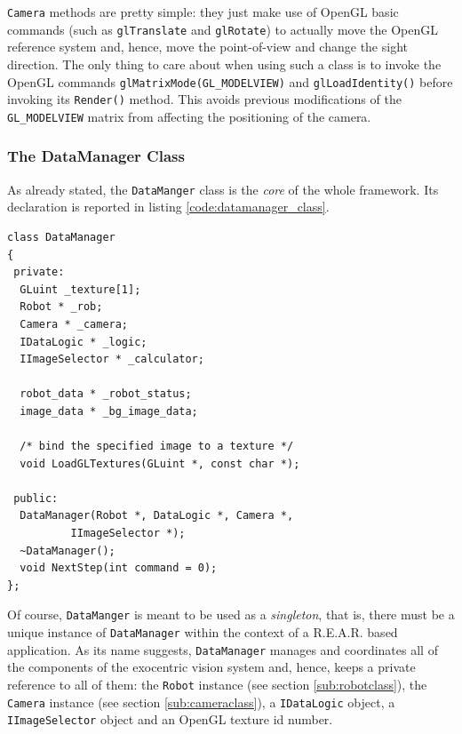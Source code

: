 %
\texttt{Camera} methods are pretty simple: they just make 
use of OpenGL basic commands (such as \texttt{glTranslate} 
and \texttt{glRotate}) to actually move the OpenGL reference 
system and, hence, move the point-of-view and change the sight 
direction.
%
The only thing to care about when using such a class is 
to invoke the OpenGL commands \texttt{glMatrixMode(GL\_MODELVIEW)} 
and \texttt{glLoadIdentity()} before invoking its 
\texttt{Render()} method. This avoids previous modifications 
of the \texttt{GL\_MODELVIEW} matrix from affecting the 
positioning of the camera.
%

%
\subsubsection{The DataManager Class}
\label{sub:datamanager}
As already stated, the \texttt{DataManger} class is the \textit{core}
of the whole framework. Its declaration is reported in 
listing \ref{code:datamanager_class}.
%
\begin{lstlisting}[caption={\texttt{DataManager} class declaration}, label={code:datamanager_class}, frame=trBL]
class DataManager
{
 private:
  GLuint _texture[1];
  Robot * _rob;
  Camera * _camera;
  IDataLogic * _logic;
  IImageSelector * _calculator;

  robot_data * _robot_status;
  image_data * _bg_image_data;

  /* bind the specified image to a texture */
  void LoadGLTextures(GLuint *, const char *);

 public:
  DataManager(Robot *, DataLogic *, Camera *, 
	      IImageSelector *); 
  ~DataManager();
  void NextStep(int command = 0);
};
\end{lstlisting}
%
Of course, \texttt{DataManger} is meant to be used as a \textit{singleton}, 
that is, there must be a unique instance of \texttt{DataManager} 
within the context of a \textsf{R.E.A.R.} based application.
%
As its name suggests, \texttt{DataManager} manages and coordinates 
all of the components of the exocentric vision system and, hence, 
keeps a private reference to all of them: 
the \texttt{Robot} instance (see section \ref{sub:robotclass}), the 
\texttt{Camera} instance (see section \ref{sub:cameraclass}),
a \texttt{IDataLogic} object, a \texttt{IImageSelector} 
object and an OpenGL texture id number.
%

